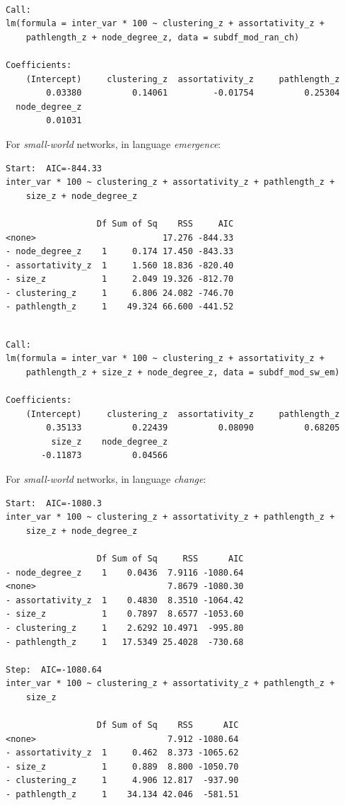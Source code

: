 \documentclass[
]{article}
\begin{document}
\begin{verbatim}

Call:
lm(formula = inter_var * 100 ~ clustering_z + assortativity_z + 
    pathlength_z + node_degree_z, data = subdf_mod_ran_ch)

Coefficients:
    (Intercept)     clustering_z  assortativity_z     pathlength_z  
        0.03380          0.14061         -0.01754          0.25304  
  node_degree_z  
        0.01031  
\end{verbatim}

For \emph{small-world} networks, in language \emph{emergence}:

\begin{verbatim}
Start:  AIC=-844.33
inter_var * 100 ~ clustering_z + assortativity_z + pathlength_z + 
    size_z + node_degree_z

                  Df Sum of Sq    RSS     AIC
<none>                         17.276 -844.33
- node_degree_z    1     0.174 17.450 -843.33
- assortativity_z  1     1.560 18.836 -820.40
- size_z           1     2.049 19.326 -812.70
- clustering_z     1     6.806 24.082 -746.70
- pathlength_z     1    49.324 66.600 -441.52
\end{verbatim}

\begin{verbatim}

Call:
lm(formula = inter_var * 100 ~ clustering_z + assortativity_z + 
    pathlength_z + size_z + node_degree_z, data = subdf_mod_sw_em)

Coefficients:
    (Intercept)     clustering_z  assortativity_z     pathlength_z  
        0.35133          0.22439          0.08090          0.68205  
         size_z    node_degree_z  
       -0.11873          0.04566  
\end{verbatim}

For \emph{small-world} networks, in language \emph{change}:

\begin{verbatim}
Start:  AIC=-1080.3
inter_var * 100 ~ clustering_z + assortativity_z + pathlength_z + 
    size_z + node_degree_z

                  Df Sum of Sq     RSS      AIC
- node_degree_z    1    0.0436  7.9116 -1080.64
<none>                          7.8679 -1080.30
- assortativity_z  1    0.4830  8.3510 -1064.42
- size_z           1    0.7897  8.6577 -1053.60
- clustering_z     1    2.6292 10.4971  -995.80
- pathlength_z     1   17.5349 25.4028  -730.68

Step:  AIC=-1080.64
inter_var * 100 ~ clustering_z + assortativity_z + pathlength_z + 
    size_z

                  Df Sum of Sq    RSS      AIC
<none>                          7.912 -1080.64
- assortativity_z  1     0.462  8.373 -1065.62
- size_z           1     0.889  8.800 -1050.70
- clustering_z     1     4.906 12.817  -937.90
- pathlength_z     1    34.134 42.046  -581.51
\end{verbatim}
\end{document}
